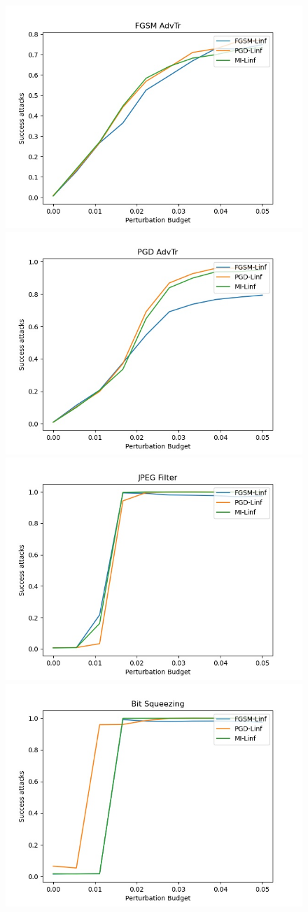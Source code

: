 \begin{figure}
  \centering
    {\includegraphics[width=0.49\linewidth]{images/exp3/untargeted/FGSM_AdvTr_succ.jpg}}
    {\includegraphics[width=0.49\linewidth]{images/exp3/untargeted/PGD_AdvTr_succ.jpg}}
    {\includegraphics[width=0.49\linewidth]{images/exp3/untargeted/JPEG_Filter_succ.jpg}}
    {\includegraphics[width=0.49\linewidth]{images/exp3/untargeted/Bit_Squeezing_succ.jpg}}

\end{figure}
